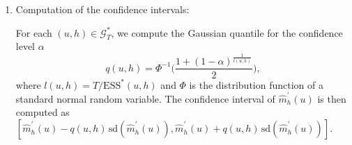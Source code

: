 \begin{enumerate}[leftmargin=0.75cm,label=(\alph*)]
\newpage
\item Computation of the confidence intervals:  

For each $(u,h) \in \mathcal{G}_T^*$, we compute the Gaussian quantile for the confidence level $\alpha$
\[ q(u,h) = \Phi^{-1} \Big(\frac{1 + (1 - \alpha)^{\frac{1}{l(u, h)}}}{2}\Big), \]
where $l(u,h) = T/\text{ESS}^*(u, h)$ and $\Phi$ is the distribution function of a standard normal random variable. The confidence interval of $\widehat{m}^\prime_h(u)$ is then computed as $[\widehat{m}^\prime_h(u) - q(u,h) \, \text{sd}(\widehat{m}^\prime_h(u)),\widehat{m}^\prime_h(u) + q(u,h) \, \text{sd}(\widehat{m}^\prime_h(u))]$. 

\end{enumerate}

